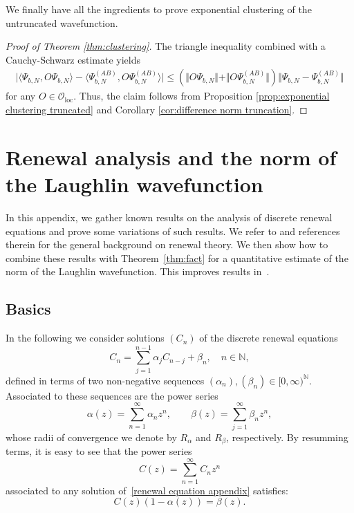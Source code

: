 \documentclass[letterpaper, DIV=17]{scrartcl}
\numberwithin{equation}{section}
\theoremstyle{definition}
\begin{document}
We finally have all the ingredients to prove exponential clustering of the untruncated wavefunction.
%
\begin{proof}[Proof of Theorem \ref{thm:clustering}]
	The triangle  inequality combined with a Cauchy-Schwarz estimate yields 
	\begin{align*}
		\vert \langle \Psi_{b,N}, O \Psi_{b,N}\rangle -\langle \Psi_{b,N}^{(AB)}, O \Psi_{b,N}^{(AB)}\rangle \vert
		\leq \left(\Vert O \Psi_{b,N}\Vert + \Vert O\Psi_{b,N}^{(AB)}\Vert\right) \Vert \Psi_{b,N}- \Psi_{b,N}^{(AB)} \Vert
	\end{align*}
	for any $O\in \mathcal{O}_\mathrm{loc}$. Thus, the claim follows from Proposition \ref{prop:exponential clustering truncated} and Corollary \ref{cor:difference norm truncation}.
\end{proof}


		\appendix 
		\section{Renewal analysis and the norm of the Laughlin wavefunction}\label{app:new}
		
		
		In this appendix, we gather known results on the analysis of discrete renewal equations and prove some variations of such results. We refer to \cite{mitov2014renewal} and references therein for the general background on renewal theory. We then show how to combine these results with Theorem~\ref{thm:fact} for a quantitative estimate of the norm of the Laughlin wavefunction. This improves results in~\cite{jansen2009symmetry}. 

		
		\subsection{Basics}
		In the following we consider solutions $ (C_n) $ of the discrete renewal equations
		\begin{equation} \label{renewal equation appendix}
			C_n = \sum_{j=1}^{n-1} \alpha_j C_{n-j} + \beta_n, \quad n \in \mathbb{N} ,  
		\end{equation}
		defined  in terms of two non-negative sequences $ (\alpha_n), (\beta_n)  \in [0,\infty)^\mathbb{N} $. 
		Associated to these sequences are the power series
		\begin{equation}\label{def:powerseries}
		 \alpha(z) = \sum_{n=1}^{\infty} \alpha_n z^n, \qquad \beta(z)=\sum_{j=1}^{\infty} \beta_n z^n , 
		 \end{equation}
		 whose radii of convergence we denote by $ R_\alpha $ and $ R_\beta $, respectively. By resumming terms, it is easy to see that the power series 
		 $$ C(z) = \sum_{n=1}^\infty C_n z^n 
		 $$ associated to any solution of~\eqref{renewal equation appendix} satisfies:
		\begin{equation} \label{renewal power series equation}
			C(z) \left(1-\alpha(z)\right) = \beta(z). 
		\end{equation} 
		
\end{document}
